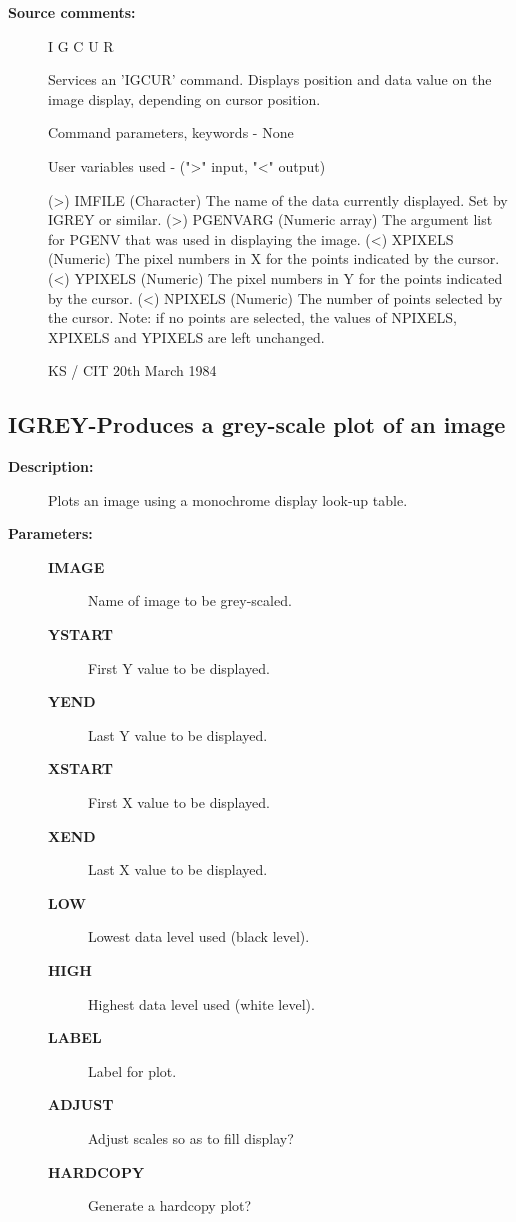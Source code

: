 \begin{description}
\begin{description}
\item [\textbf{Source comments:}]
\begin{terminalv}
 I G C U R

 Services an 'IGCUR' command.   Displays position and
 data value on the image display, depending on cursor position.

 Command parameters, keywords - None

 User variables used -   (">" input, "<" output)

 (>) IMFILE    (Character) The name of the data currently
               displayed.  Set by IGREY or similar.
 (>) PGENVARG  (Numeric array) The argument list for PGENV that was
               used in displaying the image.
 (<) XPIXELS   (Numeric) The pixel numbers in X for the
               points indicated by the cursor.
 (<) YPIXELS   (Numeric) The pixel numbers in Y for the
               points indicated by the cursor.
 (<) NPIXELS   (Numeric) The number of points selected by
               the cursor.  Note: if no points are selected,
               the values of NPIXELS, XPIXELS and YPIXELS
               are left unchanged.

                                      KS / CIT 20th March 1984
\end{terminalv}
\end{description}
\subsection{IGREY-\label{IGREY}Produces a grey-scale plot of an image}
\begin{description}

\item [\textbf{Description:}]
 Plots an image using a monochrome display look-up table.

\item [\textbf{Parameters:}]
\begin{description}
\item [\textbf{IMAGE}]
 Name of image to be grey-scaled.
\item [\textbf{YSTART}]
 First Y value to be displayed.
\item [\textbf{YEND}]
 Last Y value to be displayed.
\item [\textbf{XSTART}]
 First X value to be displayed.
\item [\textbf{XEND}]
 Last X value to be displayed.
\item [\textbf{LOW}]
 Lowest data level used (black level).
\item [\textbf{HIGH}]
 Highest data level used (white level).
\item [\textbf{LABEL}]
 Label for plot.
\item [\textbf{ADJUST}]
 Adjust scales so as to fill display?
\item [\textbf{HARDCOPY}]
 Generate a hardcopy plot?
\end{description}


\end{description}
\end{description}
